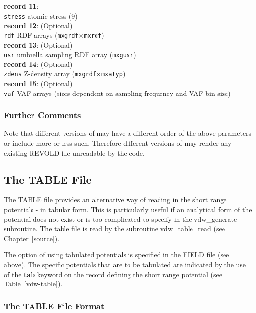 \begin{tabbing}
{\bf record 11}: \\
\> {\tt stress} \>  atomic stress (9) \\
{\bf record 12}: (Optional) \\
\> {\tt rdf}    \> RDF arrays ({\tt mxgrdf}$\times${\tt mxrdf}) \\
{\bf record 13}: (Optional) \\
\> {\tt usr}    \> umbrella sampling RDF array ({\tt mxgusr}) \\
{\bf record 14}: (Optional) \\
\> {\tt zdens}  \> Z-density array ({\tt mxgrdf}$\times${\tt mxatyp}) \\
{\bf record 15}: (Optional) \\
\> {\tt vaf}    \> VAF arrays (sizes dependent on sampling frequency and VAF bin size)
\end{tabbing}

\subsubsection{Further Comments}

Note that different versions of \D may have a different order of
the above parameters or include more or less such.  Therefore
different versions of \D may render any existing REVOLD file
unreadable by the code.

\subsection{The TABLE File}
\label{table-file}

The TABLE file provides an alternative way of reading in the short
range potentials - in tabular form.  This is particularly useful if
an analytical form of the potential does not exist or is too
complicated to specify in the {\sc vdw\_generate} subroutine. The
table file is read by the subroutine {\sc vdw\_table\_read} (see
Chapter~\ref{source}).

The option of using tabulated
potentials is specified in the FIELD file (see above).  The
specific potentials that are to be tabulated are indicated by the
use of the {\bf tab} keyword on the record defining the short
range potential (see Table~\ref{vdw-table}).

\subsubsection{The TABLE File Format}

